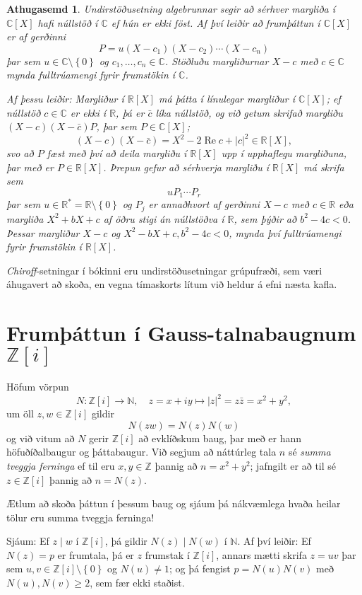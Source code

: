 \documentclass[a4paper,icelandic,11pt]{book}
\theoremstyle{plain}
\newtheorem*{ath}{Athugasemd}
\newcommand{\R}{\mathbb{R}}
\newcommand{\N}{\mathbb{N}}
\newcommand{\Z}{\mathbb{Z}}
\newcommand{\C}{\mathbb{C}}
\DeclareMathOperator{\re}{Re} %
\begin{document}
\begin{ath}
  Undirstöðusetning algebrunnar segir að sérhver margliða í $\C[X]$ hafi
  núllstöð í $\C$ ef hún er ekki föst. Af því leiðir að frumþáttun í $\C[X]$ er
  af gerðinni 
  \[
  P = u(X-c_1)(X-c_2)\cdots(X-c_n)
  \]
  þar sem $u\in\C\setminus\left\{ 0 \right\}$ og $c_1,\dots,c_n\in\C$. Stöðluðu
  margliðurnar $X-c$ með $c\in\C$ mynda fulltrúamengi fyrir frumstökin í $\C$. 
  
  \emph{Af þessu leiðir:} Margliður í $\R[X]$ má þátta í línulegar margliður í
  $\C[X]$; ef núllstöð $c\in\C$ er ekki í $\R$, þá er $\bar c$ líka núllstöð, og
  við getum skrifað margliðu $(X-c)(X-\bar c)P$, þar sem $P\in\C[X]$; \[
  (X-c)(X-\bar c) = X^2 - 2\re c + |c|^2 \in \R[X],
  \]
  svo að $P$ fæst með því að deila margliðu í $\R[X]$ upp í upphaflegu
  margliðuna, þar með er $P\in\R[X]$. Þrepun gefur að sérhverja margliðu í
  $\R[X]$ má skrifa sem
  \[
  u P_1\cdots P_r
  \]
  þar sem $u\in\R^* = \R\setminus\left\{ 0 \right\}$ og $P_j$ er annaðhvort af
  gerðinni $X-c$ með $c\in\R$ eða margliða $X^2 + bX+c$ af öðru stigi án
  núllstöðva í $\R$, sem þýðir að $b^2 - 4c < 0$. Þessar margliður $X-c$ og
  $X^2-bX+c,b^2-4c<0$, mynda því fulltrúamengi fyrir frumstökin í $\R[X]$. 
\end{ath}
\emph{Chiroff}-setningar í bókinni eru undirstöðusetningar grúpufræði, sem væri
áhugavert að skoða, en vegna tímaskorts lítum við heldur á efni næsta kafla.

\chapter{Frumþáttun í Gauss-talnabaugnum $\Z[i]$}

Höfum vörpun \[
N:\Z[i]\to\N, 
\quad
z=x+iy \mapsto |z|^2 = z\bar z = x^2 + y^2,
\]
um öll $z,w\in\Z[i]$ gildir \[
N(zw) = N(z)N(w)
\]
og við vitum að $N$ gerir $\Z[i]$ að evklíðskum baug, þar með er hann
höfuðíðalbaugur og þáttabaugur. Við segjum að náttúrleg tala $n$ sé
\emph{summa tveggja ferninga} ef til eru $x,y\in\Z$ þannig
að $n = x^2 + y^2$; jafngilt er að til sé $z\in\Z[i]$ þannig að $n = N(z)$.

Ætlum að skoða þáttun í þessum baug og sjáum þá nákvæmlega hvaða heilar tölur eru
summa tveggja ferninga!


Sjáum: Ef $z\mid w$ í $\Z[i]$, þá gildir $N(z)\mid
N(w)$ í $\N$. Af því leiðir: Ef $N(z)=p$ er frumtala, þá er $z$ frumstak í
$\Z[i]$, annars mætti skrifa $z=uv$ þar sem $u,v\in\Z[i]\setminus\left\{0
\right\}$ og $N(u)\neq 1$; og þá fengist $p = N(u)N(v)$ með $N(u),N(v)\geq 2$,
sem fær ekki staðist.
\end{document}
